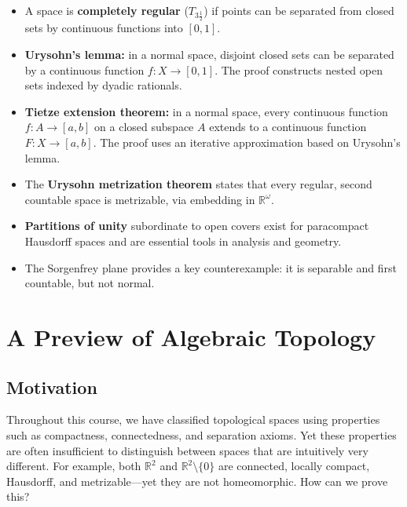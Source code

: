 \documentclass[11pt,a4paper,twoside]{book}
\theoremstyle{remark}
\theoremstyle{definition}
\theoremstyle{definition}
\begin{document}
\begin{itemize}
  \item A space is \textbf{completely regular} ($T_{3\frac{1}{2}}$) if
        points can be separated from closed sets by continuous functions
        into $[0,1]$.
  \item \textbf{Urysohn's lemma:} in a normal space, disjoint closed
        sets can be separated by a continuous function $f\colon X\to[0,1]$.
        The proof constructs nested open sets indexed by dyadic rationals.
  \item \textbf{Tietze extension theorem:} in a normal space, every
        continuous function $f\colon A\to[a,b]$ on a closed subspace $A$
        extends to a continuous function $F\colon X\to[a,b]$.  The proof
        uses an iterative approximation based on Urysohn's lemma.
  \item The \textbf{Urysohn metrization theorem} states that every
        regular, second countable space is metrizable, via embedding in
        $\mathbb{R}^\omega$.
  \item \textbf{Partitions of unity} subordinate to open covers exist
        for paracompact Hausdorff spaces and are essential tools in
        analysis and geometry.
  \item The Sorgenfrey plane provides a key counterexample: it is
        separable and first countable, but not normal.
\end{itemize}



\chapter{A Preview of Algebraic Topology}
\label{ch:algebraic-topology}

\section*{Motivation}

Throughout this course, we have classified topological spaces using
properties such as compactness, connectedness, and separation axioms.
Yet these properties are often insufficient to distinguish between
spaces that are intuitively very different.  For example, both
$\mathbb{R}^2$ and $\mathbb{R}^2\setminus\{0\}$ are connected, locally
compact, Hausdorff, and metrizable---yet they are not homeomorphic.
How can we prove this?
\end{document}
